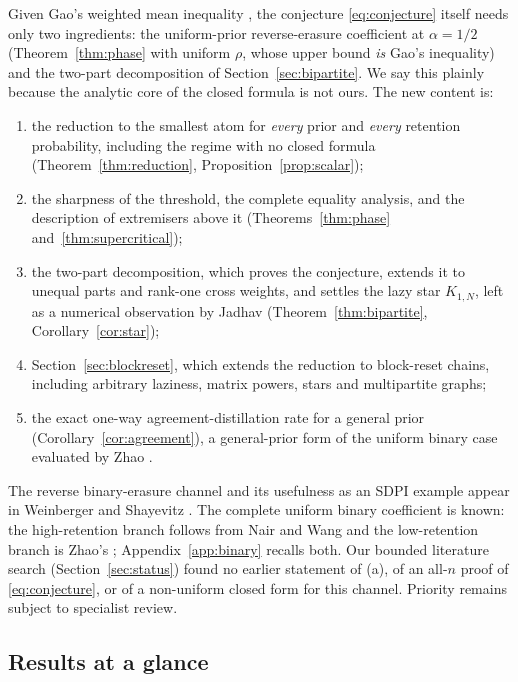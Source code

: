 \documentclass[11pt,a4paper]{article}
\numberwithin{equation}{section}
\theoremstyle{definition}
\theoremstyle{remark}
\begin{document}
Given Gao's weighted mean inequality \cite{gao03,gao09}, the conjecture
\eqref{eq:conjecture} itself needs only two ingredients: the uniform-prior
reverse-erasure coefficient at \(\alpha=1/2\) (Theorem~\ref{thm:phase} with
uniform \(\rho\), whose upper bound \emph{is} Gao's inequality) and the
two-part decomposition of Section~\ref{sec:bipartite}. We say this plainly
because the analytic core of the closed formula is not ours. The new content
is:
\begin{enumerate}[label=(\alph*)]
\item the reduction to the smallest atom for \emph{every} prior and
\emph{every} retention probability, including the regime with no closed
formula (Theorem~\ref{thm:reduction}, Proposition~\ref{prop:scalar});
\item the sharpness of the threshold, the complete equality analysis, and
the description of extremisers above it
(Theorems~\ref{thm:phase} and~\ref{thm:supercritical});
\item the two-part decomposition, which proves the conjecture, extends it to
unequal parts and rank-one cross weights, and settles the lazy star
\(K_{1,N}\), left as a numerical observation by Jadhav \cite{jadhav}
(Theorem~\ref{thm:bipartite}, Corollary~\ref{cor:star});
\item Section~\ref{sec:blockreset}, which extends the reduction to
block-reset chains, including arbitrary laziness, matrix powers, stars and
multipartite graphs;
\item the exact one-way agreement-distillation rate for a general prior
(Corollary~\ref{cor:agreement}), a general-prior form of the uniform binary
case evaluated by Zhao \cite{zhao}.
\end{enumerate}
The reverse binary-erasure channel and its usefulness as an SDPI example
appear in Weinberger and Shayevitz \cite{weinberger}. The complete uniform
binary coefficient is known: the high-retention branch follows from Nair and
Wang \cite{nair} and the low-retention branch is Zhao's
\cite[Theorem~3.5.4]{zhao}; Appendix~\ref{app:binary} recalls both. Our
bounded literature search (Section~\ref{sec:status}) found no earlier
statement of (a), of an all-\(n\) proof of \eqref{eq:conjecture}, or of a
non-uniform closed form for this channel. Priority remains subject to
specialist review.

\subsection{Results at a glance}
\end{document}
